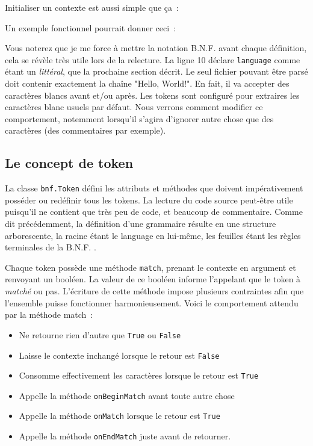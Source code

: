 \documentclass[a4paper]{article}
\newcommand{\fixed}[1]{\texttt{#1}}
\newcommand{\bnf}{B.N.F. }
\begin{document}
            Initialiser un contexte est aussi simple que ça~:

            Un exemple fonctionnel pourrait donner ceci~:

            Vous noterez que je me force à mettre la notation \bnf avant chaque
            définition, cela se révèle très utile lors de la relecture. La ligne 10
            déclare \fixed{language} comme étant un \emph{littéral}, que la
            prochaine section décrit. Le seul fichier pouvant être parsé doit
            contenir exactement la chaîne "Hello, World!". En fait, il va
            accepter des caractères blancs avant et/ou après. Les tokens sont
            configuré pour extraires les caractères blanc usuels par défaut.
            Nous verrons comment modifier ce comportement, notemment lorsqu'il
            s'agira d'ignorer autre chose que des caractères (des commentaires
            par exemple).

        \subsection{Le concept de token}
            La classe \fixed{bnf.Token} défini les attributs et méthodes que
            doivent impérativement posséder ou redéfinir tous les tokens.
            La lecture du code source peut-être utile puisqu'il ne contient
            que très peu de code, et beaucoup de commentaire.
            Comme dit précédemment, la définition
            d'une grammaire résulte en une structure arborescente, la racine
            étant le language en lui-même, les feuilles étant les règles
            terminales de la \bnf.

            Chaque token possède une méthode \fixed{match}, prenant
            le contexte en argument et renvoyant un booléen. La valeur de ce booléen
            informe l'appelant que le token à \emph{matché} ou pas. L'écriture de
            cette méthode impose plusieurs contraintes afin que l'ensemble puisse
            fonctionner harmonieusement.
            Voici le comportement attendu par la méthode match~:
            \begin{itemize}
                \item Ne retourne rien d'autre que \fixed{True} ou \fixed{False}
                \item Laisse le contexte inchangé lorsque le retour est \fixed{False}
                \item Consomme effectivement les caractères lorsque le retour est \fixed{True}
                \item Appelle la méthode \fixed{onBeginMatch} avant toute autre chose
                \item Appelle la méthode \fixed{onMatch} lorsque le retour est \fixed{True}
                \item Appelle la méthode \fixed{onEndMatch} juste avant de retourner.
            \end{itemize}
\end{document}
